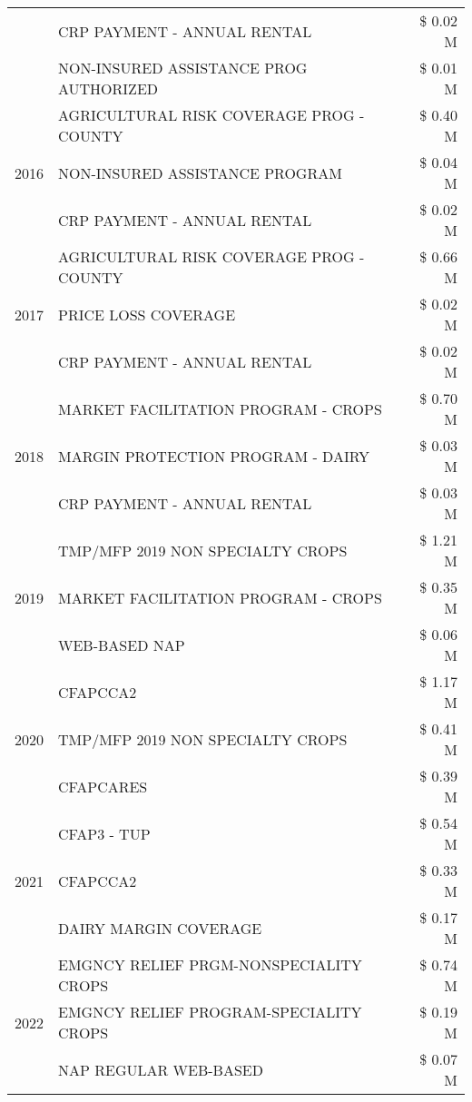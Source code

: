 \begin{tabular}{llr}
 & CRP PAYMENT - ANNUAL RENTAL & \$ 0.02 M \\
 & NON-INSURED ASSISTANCE PROG AUTHORIZED & \$ 0.01 M \\
\cline{1-3}
\multirow[t]{3}{*}{2016} & AGRICULTURAL RISK COVERAGE PROG - COUNTY & \$ 0.40 M \\
 & NON-INSURED ASSISTANCE PROGRAM & \$ 0.04 M \\
 & CRP PAYMENT - ANNUAL RENTAL & \$ 0.02 M \\
\cline{1-3}
\multirow[t]{3}{*}{2017} & AGRICULTURAL RISK COVERAGE PROG - COUNTY & \$ 0.66 M \\
 & PRICE LOSS COVERAGE & \$ 0.02 M \\
 & CRP PAYMENT - ANNUAL RENTAL & \$ 0.02 M \\
\cline{1-3}
\multirow[t]{3}{*}{2018} & MARKET FACILITATION PROGRAM - CROPS & \$ 0.70 M \\
 & MARGIN PROTECTION PROGRAM - DAIRY & \$ 0.03 M \\
 & CRP PAYMENT - ANNUAL RENTAL & \$ 0.03 M \\
\cline{1-3}
\multirow[t]{3}{*}{2019} & TMP/MFP 2019 NON SPECIALTY CROPS & \$ 1.21 M \\
 & MARKET FACILITATION PROGRAM - CROPS & \$ 0.35 M \\
 & WEB-BASED NAP & \$ 0.06 M \\
\cline{1-3}
\multirow[t]{3}{*}{2020} & CFAPCCA2 & \$ 1.17 M \\
 & TMP/MFP 2019 NON SPECIALTY CROPS & \$ 0.41 M \\
 & CFAPCARES & \$ 0.39 M \\
\cline{1-3}
\multirow[t]{3}{*}{2021} & CFAP3 - TUP & \$ 0.54 M \\
 & CFAPCCA2 & \$ 0.33 M \\
 & DAIRY MARGIN COVERAGE & \$ 0.17 M \\
\cline{1-3}
\multirow[t]{3}{*}{2022} & EMGNCY RELIEF PRGM-NONSPECIALITY CROPS & \$ 0.74 M \\
 & EMGNCY RELIEF PROGRAM-SPECIALITY CROPS & \$ 0.19 M \\
 & NAP REGULAR WEB-BASED & \$ 0.07 M \\
\cline{1-3}
\bottomrule
\end{tabular}
